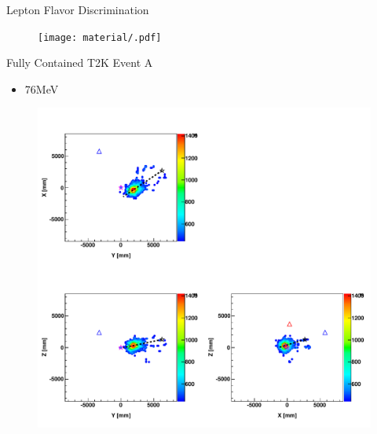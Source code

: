 \documentclass{beamer} %
\begin{document}
\begin{frame}{Lepton Flavor Discrimination}
	\begin{figure}
		\texttt{[image: material/.pdf]}
	\end{figure}
\end{frame}

\begin{frame}{Fully Contained T2K Event A}
	\begin{itemize}
		\item 76MeV
	\end{itemize}
	\begin{figure}
		\includegraphics[width=\textwidth,height=0.9\textheight,keepaspectratio]
			{material/fom_map__run11331_evt29962767.pdf}
	\end{figure}
\end{frame}
\end{document}
